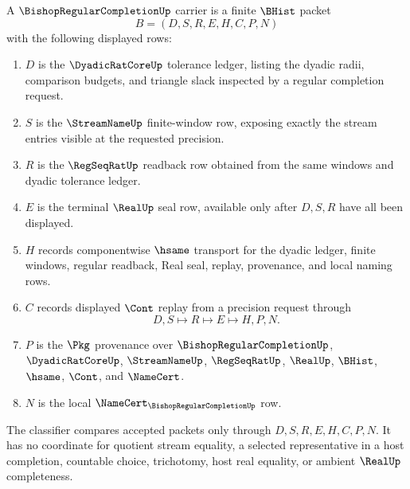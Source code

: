 \begin{definition}
\label{def:bishop-regular-completion-carrier}
A $\BishopRegularCompletionUp$ carrier is a finite $\BHist$ packet
$$
B=(D,S,R,E,H,C,P,N)
$$
with the following displayed rows:
\begin{enumerate}
\item $D$ is the $\DyadicRatCoreUp$ tolerance ledger, listing the dyadic radii, comparison budgets, and triangle slack inspected by a regular completion request.
\item $S$ is the $\StreamNameUp$ finite-window row, exposing exactly the stream entries visible at the requested precision.
\item $R$ is the $\RegSeqRatUp$ readback row obtained from the same windows and dyadic tolerance ledger.
\item $E$ is the terminal $\RealUp$ seal row, available only after $D,S,R$ have all been displayed.
\item $H$ records componentwise $\hsame$ transport for the dyadic ledger, finite windows, regular readback, Real seal, replay, provenance, and local naming rows.
\item $C$ records displayed $\Cont$ replay from a precision request through
$$
D,S \longmapsto R \longmapsto E \longmapsto H,P,N .
$$
\item $P$ is the $\Pkg$ provenance over $\BishopRegularCompletionUp$, $\DyadicRatCoreUp$, $\StreamNameUp$, $\RegSeqRatUp$, $\RealUp$, $\BHist$, $\hsame$, $\Cont$, and $\NameCert$.
\item $N$ is the local $\NameCert_{\BishopRegularCompletionUp}$ row.
\end{enumerate}
The classifier compares accepted packets only through $D,S,R,E,H,C,P,N$. It has no coordinate for quotient stream equality, a selected representative in a host completion, countable choice, trichotomy, host real equality, or ambient $\RealUp$ completeness.
\end{definition}

